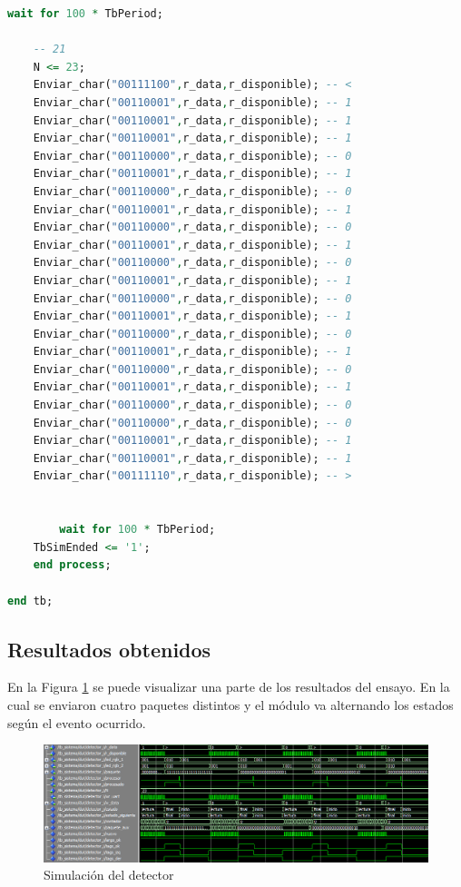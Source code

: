 \begin{lstlisting}[language = vhdl,caption=Testbench del módulo detector,label={lst:test_detector}]
	wait for 100 * TbPeriod;

	-- 21
	N <= 23; 	
	Enviar_char("00111100",r_data,r_disponible); -- < 	
	Enviar_char("00110001",r_data,r_disponible); -- 1 	
	Enviar_char("00110001",r_data,r_disponible); -- 1
 	Enviar_char("00110001",r_data,r_disponible); -- 1 	
	Enviar_char("00110000",r_data,r_disponible); -- 0
	Enviar_char("00110001",r_data,r_disponible); -- 1 	
	Enviar_char("00110000",r_data,r_disponible); -- 0
	Enviar_char("00110001",r_data,r_disponible); -- 1 	
	Enviar_char("00110000",r_data,r_disponible); -- 0
	Enviar_char("00110001",r_data,r_disponible); -- 1 	
	Enviar_char("00110000",r_data,r_disponible); -- 0
	Enviar_char("00110001",r_data,r_disponible); -- 1 	
	Enviar_char("00110000",r_data,r_disponible); -- 0
	Enviar_char("00110001",r_data,r_disponible); -- 1 	
	Enviar_char("00110000",r_data,r_disponible); -- 0
	Enviar_char("00110001",r_data,r_disponible); -- 1 	
	Enviar_char("00110000",r_data,r_disponible); -- 0
	Enviar_char("00110001",r_data,r_disponible); -- 1 	
	Enviar_char("00110000",r_data,r_disponible); -- 0
	Enviar_char("00110000",r_data,r_disponible); -- 0 	
	Enviar_char("00110001",r_data,r_disponible); -- 1
	Enviar_char("00110001",r_data,r_disponible); -- 1 	
	Enviar_char("00111110",r_data,r_disponible); -- >


        wait for 100 * TbPeriod;
	TbSimEnded <= '1';
    end process;
	
end tb;
		\end{lstlisting}
			
	\subsection{Resultados obtenidos}
				
		En la Figura \ref{fig:Test_Detector} se puede visualizar una parte de los resultados del ensayo. En la cual se enviaron cuatro paquetes distintos y el módulo va alternando los estados según el evento ocurrido. 
		
		\begin{figure}[h]
		\centering
		\includegraphics[scale=0.5]{./Figures/Test/Detector}
			\caption{Simulación del detector}
			\label{fig:Test_Detector}
		\end{figure}


